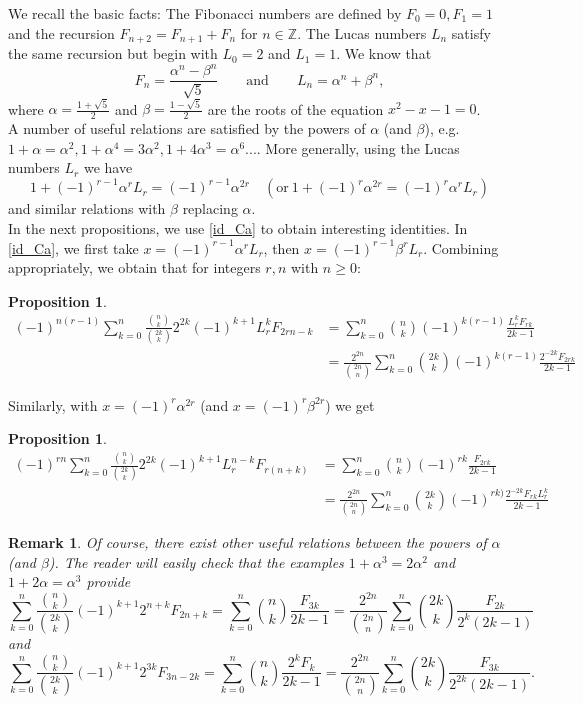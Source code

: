 \documentclass[11pt,reqno]{amsart}
\theoremstyle{plain}
\numberwithin{equation}{section}
\newtheorem{proposition}[thm]{Proposition}
\newtheorem{remark}[thm]{Remark}
\begin{document}
We recall the basic facts: The Fibonacci numbers are defined by $F_0=0,F_1=1$ and the recursion $F_{n+2}=F_{n+1}+F_n$ for $n\in\mathbb{Z}$. The Lucas numbers $L_n$ satisfy the same recursion but begin with $L_0=2$ and $L_1=1$. We know that 
$$F_n=\frac{\alpha^n-\beta^n}{\sqrt{5}} \qquad\text{and}\qquad L_n=\alpha^n+\beta^n,$$
where $\alpha=\frac{1+\sqrt{5}}{2}$ and $\beta=\frac{1-\sqrt{5}}{2}$ are the roots of the equation $x^2-x-1=0$.\\
A number of useful relations are satisfied by the powers of $\alpha$ (and $\beta$), e.g. $1+\alpha=\alpha^2,1+\alpha^4=3\alpha^2,1+4\alpha^3=\alpha^6...$. More generally, using the Lucas numbers $L_r$ we have 
\[1+(-1)^{r-1}\alpha^r L_r=(-1)^{r-1}\alpha^{2r}\quad (\mbox{or}\  1+(-1)^r\alpha^{2r}=(-1)^r\alpha^r L_r )\]
and similar relations with $\beta$ replacing $\alpha$. \\

In the next propositions, we use \eqref{id_Ca} to obtain interesting identities. In \eqref{id_Ca}, we first take $x=(-1)^{r-1}\alpha^r L_r$, then $x=(-1)^{r-1}\beta^r L_r$. Combining appropriately, we obtain that for integers $r,n$ with $n\ge 0$:  
\begin{proposition}
\begin{align*}
(-1)^{n(r-1)}\sum_{k=0}^n\frac{\binom{n}{k}}{\binom{2k}{k}}2^{2k}(-1)^{k+1}L_r^k F_{2rn-k}&=\sum_{k=0}^n\binom{n}{k}(-1)^{k(r-1)}\frac{L_r^k F_{rk}}{2k-1}\\
&=\frac{2^{2n}}{\binom{2n}{n}}\sum_{k=0}^n\binom{2k}{k}(-1)^{k(r-1)}\frac{2^{-2k} F_{2rk}}{2k-1}
\end{align*}
\end{proposition}
Similarly, with $x=(-1)^r\alpha^{2r}$ (and $x=(-1)^r\beta^{2r}$) we get
\begin{proposition}
\begin{align*}
(-1)^{rn}\sum_{k=0}^n\frac{\binom{n}{k}}{\binom{2k}{k}}2^{2k}(-1)^{k+1}L_r^{n-k} F_{r(n+k)}&=\sum_{k=0}^n\binom{n}{k}(-1)^{rk}\frac{F_{2rk}}{2k-1}\\
&=\frac{2^{2n}}{\binom{2n}{n}}\sum_{k=0}^n\binom{2k}{k}(-1)^{rk)}\frac{2^{-2k} F_{rk}L_r^k}{2k-1}
\end{align*}
\end{proposition}

\begin{remark}
Of course, there exist other useful relations between the powers of $\alpha$ (and $\beta$). The reader  will easily check that the examples $1+\alpha^3=2\alpha^2$ and $ 1+2\alpha=\alpha^3$ provide
\[\sum_{k=0}^n\frac{\binom{n}{k}}{\binom{2k}{k}}(-1)^{k+1}2^{n+k}F_{2n+k}=\sum_{k=0}^n\binom{n}{k}\frac{F_{3k}}{2k-1}=\frac{2^{2n}}{\binom{2n}{n}}\sum_{k=0}^n\binom{2k}{k}\frac{F_{2k}}{2^k(2k-1)}\]
and
\[\sum_{k=0}^n\frac{\binom{n}{k}}{\binom{2k}{k}}(-1)^{k+1}2^{3k}F_{3n-2k}=\sum_{k=0}^n\binom{n}{k}\frac{2^k F_{k}}{2k-1}=\frac{2^{2n}}{\binom{2n}{n}}\sum_{k=0}^n\binom{2k}{k}\frac{F_{3k}}{2^{2k}(2k-1)}.\]
\end{remark}
\end{document}
